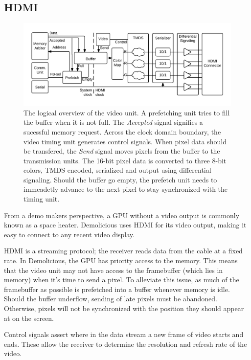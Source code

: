 \documentclass[../main/report.tex]{subfiles}
\begin{document}
\subsection{HDMI}
\begin{figure}
	\centering
	\includegraphics[width=\textwidth]{diagrams/HDMI_overview.png}
	\caption{
		The logical overview of the video unit.
		A prefetching unit tries to fill the buffer when it is not full.
		The \emph{Accepted} signal signifies a sucessful memory request.
		Across the clock domain boundary, the video timing unit generates control signals.
		When pixel data should be transfered, the \emph{Send} signal moves pixels from the buffer to the transmission units.
		The 16-bit pixel data is converted to three 8-bit colors, TMDS encoded, serialized and output using differential signaling.
		Should the buffer go empty, the prefetch unit needs to immeadetly advance to the next pixel to stay synchronized with the timing unit.
	}
	\label{fig:video_unit}
\end{figure}
From a demo makers perspective, a GPU without a video output is commonly known as a space heater.
Demolicious uses HDMI for its video output, making it easy to connect to any recent video display.

HDMI is a streaming protocol; the receiver reads data from the cable at a fixed rate.
In Demolicious, the GPU has priority access to the memory.
This means that the video unit may not have access to the framebuffer (which lies in memory) when it's time to send a pixel.
To alleviate this issue, as much of the framebuffer as possible is prefetched into a buffer whenever memory is idle.
Should the buffer underflow, sending of late pixels must be abandoned.
Otherwise, pixels will not be synchronized with the position they should appear at on the screen.

Control signals assert where in the data stream a new frame of video starts and ends.
These allow the receiver to determine the resolution and refresh rate of the video.
\end{document}
